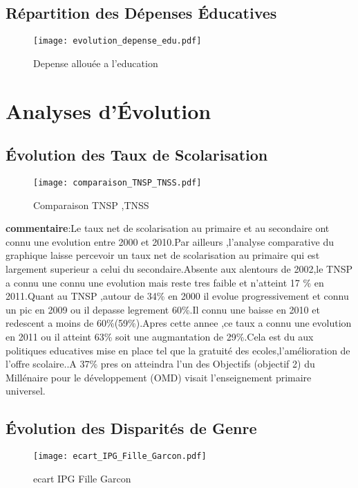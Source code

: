 \documentclass[a4paper,12pt]{report}
\begin{document}
\subsection{Répartition des Dépenses Éducatives}
\begin{figure}[ht]
    \centering
    \texttt{[image: evolution\_depense\_edu.pdf]}
    \caption{Depense allouée a l'education}
    \label{fig:depenses_education}
\end{figure}
\noindent
\section{Analyses d'Évolution}
\subsection{Évolution des Taux de Scolarisation}
\begin{figure}[ht]
    \centering
    \texttt{[image: comparaison\_TNSP\_TNSS.pdf]}
    \caption{Comparaison TNSP ,TNSS}
    \label{fig:TSS_TNSP}
\end{figure}
\noindent
\textbf{commentaire}:Le taux net de scolarisation au primaire et au secondaire ont connu une evolution entre 2000 et 2010.Par ailleurs ,l'analyse comparative du graphique  laisse percevoir un taux net de scolarisation au primaire qui est largement superieur a celui du secondaire.Absente aux alentours de 2002,le TNSP a connu une connu une evolution mais reste tres faible et n'atteint 17 \% en 2011.Quant au TNSP ,autour de 34\% en 2000 il evolue progressivement et connu un pic en 2009 ou il depasse legrement 60\%.Il connu une baisse en 2010 et redescent a moins de 60\%(59\%).Apres cette annee ,ce taux a connu une evolution en 2011 ou il atteint 63\% soit une augmantation de 29\%.Cela est du aux politiques educatives mise en place tel que la gratuité des ecoles,l’amélioration de l’offre scolaire..A 37\% pres on atteindra l’un des Objectifs (objectif 2) du Millénaire pour le développement (OMD) visait l’enseignement primaire universel.
\subsection{Évolution des Disparités de Genre}
\begin{figure}[ht]
    \centering
    \texttt{[image: ecart\_IPG\_Fille\_Garcon.pdf]}
    \caption{ecart IPG Fille Garcon}
    \label{fig:ecart_IPG_Fille_Garcon}
\end{figure}
\end{document}
